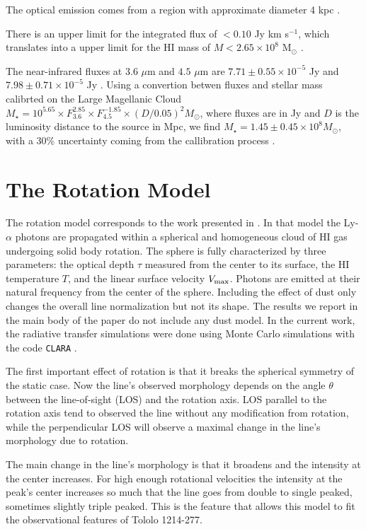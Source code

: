 \documentclass[a4paper, usenatbib, 12pt]{article}
\newcommand{\tol}{Tololo 1214-277}
\begin{document}
{The optical emission  comes from a   region with approximate diameter
4 kpc \cite{Fricke01}. 

There is an upper limit for the  
integrated flux of $<0.10$ Jy km s$^{-1}$, which translates into a
upper limit for the HI mass of $M<2.65\times 10^{8}$ M$_{\odot}$
\cite{pustilnikmartin07}.  

The near-infrared fluxes at $3.6$ $\mu$m and $4.5$ $\mu$m are
$7.71\pm0.55\times 10^{-5}$ Jy and $7.98\pm0.71\times 10^{-5}$ Jy
\cite{2008ApJ...678..804E}.  Using a convertion betwen fluxes and
stellar mass calibrted on the Large Magellanic Cloud $M_{\star} =
10^{5.65} \times F_{3.6}^{2.85} \times F_{4.5}^{-1.85} \times
(D/0.05)^2 M_{\odot}$, where fluxes are in Jy and $D$ is the luminosity
distance to the source in Mpc, we find $M_{\star} = 1.45\pm0.45\times 10^{8}
M_{\odot}$, with a $30\%$ uncertainty coming from the callibration
process \cite{2012AJ....143..139E}.  



\section*{The Rotation Model}

The rotation model corresponds to the work presented in
\cite{GaravitoCamargo2014}. 
In that model the Ly-$\alpha$ photons are propagated 
within a spherical and homogeneous cloud of HI gas undergoing solid
body rotation.
The sphere is fully characterized by three parameters: the optical
depth $\tau$ measured from the center to its surface, the HI
temperature $T$, and the linear surface velocity $V_{\rm max}$.  
Photons are emitted at their natural frequency from the center of the
sphere. 
Including the effect of dust only changes the overall line
normalization but not its shape.  
The results we report in the main body of the paper do not include any
dust model.
In the current work, the radiative transfer simulations were done
using Monte Carlo simulations with the code \texttt{CLARA}
\cite{CLARA}.  

The first important effect of rotation is that it breaks the spherical
symmetry of the static case. 
Now the line's observed morphology depends on the angle $\theta$ between the
line-of-sight (LOS) and the rotation axis. 
LOS parallel to the rotation axis tend to observed the line without
any modification from rotation, while the perpendicular LOS will
observe a maximal change in the line's morphology due to rotation.

The main change in the line's morphology is that it broadens and the
intensity at the center increases. 
For high enough rotational velocities the intensity at the peak's
center increases so much that the line goes from double to single
peaked, sometimes slightly triple peaked.
This is the feature that allows this model to fit the observational
features of \tol.

}
\end{document}
